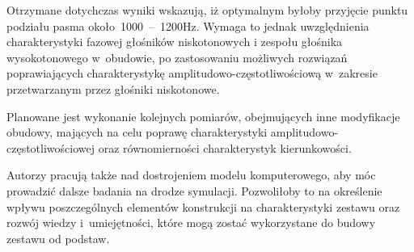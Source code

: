 \documentclass[12pt]{oska}
\newcommand{\range}[2]{\num{#1}~--~\num{#2}}
\begin{document}
	Otrzymane dotychczas wyniki wskazują, iż optymalnym byłoby przyjęcie punktu podziału pasma około~\range{1000}{1200}\si{Hz}. Wymaga to jednak uwzględnienia charakterystyki fazowej głośników niskotonowych i zespołu głośnika wysokotonowego w~obudowie, po zastosowaniu możliwych rozwiązań poprawiających charakterystykę amplitudowo-częstotliwościową w~zakresie przetwarzanym przez głośniki niskotonowe. 
	
	Planowane jest wykonanie kolejnych pomiarów, obejmujących inne modyfikacje obudowy, mających na celu poprawę charakterystyki amplitudowo-częstotliwościowej oraz równomierności charakterystyk kierunkowości. 
	
	Autorzy pracują także nad dostrojeniem modelu komputerowego, aby móc prowadzić dalsze badania na drodze symulacji. Pozwoliłoby to na określenie wpływu poszczególnych elementów konstrukcji na charakterystyki zestawu oraz rozwój wiedzy i~umiejętności, które mogą zostać wykorzystane do budowy zestawu od podstaw. 
	
	\printbibliography
	
\end{document}
